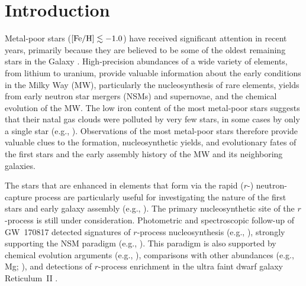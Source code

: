 \documentclass[preprint]{aastex61}
\begin{document}
\section{Introduction}\label{sec:Intro}
Metal-poor stars ($[\rm{Fe/H}]\lesssim -1.0$) have received
significant attention in recent years, primarily because they are
believed to be some of the oldest remaining stars in the Galaxy
\citep{BeersChristlieb2005,FrebelNorris2015}. High-precision abundances
of a wide variety of elements, from lithium to uranium, provide
valuable information about the early conditions in the Milky Way (MW),
particularly the nucleosynthesis of rare elements, yields from early
neutron star mergers (NSMs) and supernovae, and the chemical evolution
of the MW. The low iron content of the most metal-poor stars suggests
that their natal gas clouds were polluted by very few stars, in some
cases by only a single star (e.g., \citealt{Ito2009,Placco2014a}).
Observations of the most metal-poor stars therefore provide valuable
clues to the formation, nucleosynthetic yields, and evolutionary fates
of the first stars and the early assembly history of the MW and its
neighboring galaxies.

The stars that are enhanced in elements that form via the rapid
($r$-) neutron-capture process are particularly useful for
investigating the nature of the first stars and early galaxy assembly
(e.g.,
\citealt{Sneden1996,Hill2002,Christlieb2004,Frebel2007,Roederer2014b,Placco2017,Hansen2018,Holmbeck2018}).
The primary nucleosynthetic site of the $r$-process is still
under consideration. Photometric and spectroscopic follow-up of
GW~170817 \citep{Abbott2017} detected signatures of $r$-process
nucleosynthesis (e.g., \citealt{Chornock2017,Drout2017,Shappee2017}),
strongly supporting the NSM paradigm (e.g.,
\citealt{LattimerSchramm1974,Rosswog2014,Lippuner2017}).  This
paradigm is also supported by chemical evolution arguments
(e.g., \citealt{Cescutti2015,Cote2017}), comparisons with other
abundances (e.g., Mg; \citealt{MaciasRamirezRuiz2016}), and detections
of $r$-process enrichment in the ultra faint dwarf galaxy Reticulum~II
\citep{Ji2016,Roederer2016,Beniamini2018}.
\end{document}
